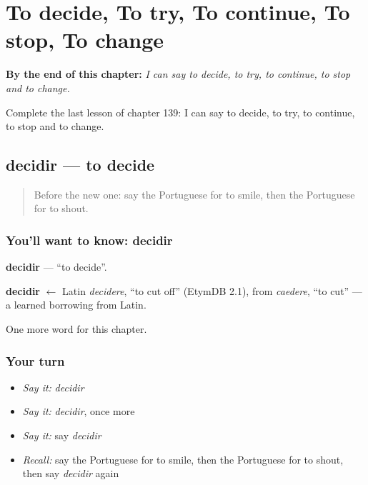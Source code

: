 
\chapter{To decide, To try, To continue, To stop, To change}
\label{ch:pt-to-decide-to-try-to-continue-to-stop-to-change}

\begin{chapteropening}
\textbf{By the end of this chapter:} \emph{I can say to decide, to try, to continue, to stop and to change.}

Complete the last lesson of chapter 139: I can say to decide, to try, to continue, to stop and to change.
\end{chapteropening}

\section[decidir]{decidir — to decide}

\label{lesson:PT-C139-decidir}



\begin{quote}
Before the new one: say the Portuguese for to smile, then the Portuguese for to shout.
\end{quote}

\subsection*{You'll want to know: decidir}
\textbf{decidir} — \textquotedblleft{}to decide\textquotedblright{}.

\begin{cousinweb}
\textbf{decidir} $\leftarrow$ Latin \emph{decidere}, \textquotedblleft{}to cut off\textquotedblright{} (EtymDB 2.1), from \emph{caedere}, \textquotedblleft{}to cut\textquotedblright{} — a learned borrowing from Latin.
\end{cousinweb}

\begin{grammarlens}[title={What you've built}]
One more word for this chapter.
\end{grammarlens}

\subsection*{Your turn}
\begin{itemize}
\raggedright
  \item \emph{Say it:} \emph{decidir}
  \item \emph{Say it:} \emph{decidir}, once more
  \item \emph{Say it:} say \emph{decidir}
  \item \emph{Recall:} say the Portuguese for to smile, then the Portuguese for to shout, then say \emph{decidir} again
\end{itemize}

